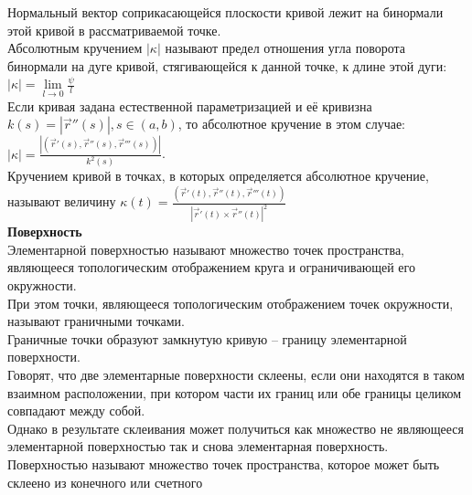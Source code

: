 \documentclass{report}
\begin{document}
\noindent
Нормальный вектор соприкасающейся плоскости кривой лежит на бинормали
этой кривой в рассматриваемой точке.\\
Абсолютным кручением $ |\kappa| $ называют предел отношения угла поворота бинормали
на дуге кривой, стягивающейся к данной точке, к длине этой дуги: 
$ |\kappa| = \lim\limits_{l \to 0}{\frac{\psi}{l}} $\\
Если кривая задана естественной параметризацией и её кривизна 
$k(s) = |\overrightarrow{r}''(s)|, s \in (a, b)$, то абсолютное кручение в этом случае:
$|\kappa| = \frac{|(\overrightarrow{r}'(s), \overrightarrow{r}''(s), \overrightarrow{r}'''(s))|}
{k^2(s)}$.\\
Кручением кривой в точках, в которых определяется абсолютное кручение, называют величину
$\kappa(t) = \frac{(\overrightarrow{r}'(t), \overrightarrow{r}''(t), \overrightarrow{r}'''(t))}
{|\overrightarrow{r}'(t) \times \overrightarrow{r}''(t)|^2}$\\


\noindent
\textbf{Поверхность}\\
Элементарной поверхностью называют множество точек пространства, являющееся топологическим
отображением круга и ограничивающей его окружности.\\
При этом точки, являющееся топологическим отображением точек окружности, называют
граничными точками.\\
Граничные точки образуют замкнутую кривую -- границу элементарной поверхности.\\
Говорят, что две элементарные поверхности склеены, если они находятся в таком взаимном
расположении, при котором части их границ или обе границы целиком совпадают между собой.\\
Однако в результате склеивания может получиться как множество не являющееся элементарной
поверхностью так и снова элементарная поверхность.\\
Поверхностью называют множество точек пространства, которое может быть склеено из конечного
или счетного 
\end{document}

